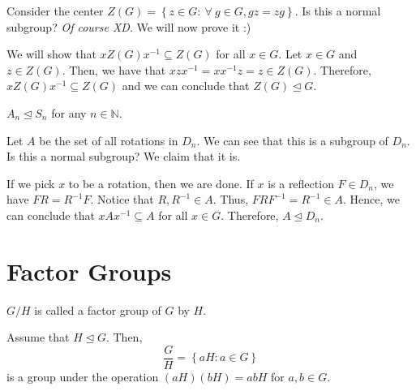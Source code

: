 \begin{nexample}
    Consider the center \(Z(G) = \left\{z \in G : \ \forall \ g \in G, gz = zg\right\}\). Is this a normal subgroup? \textit{Of course XD}. We will now prove it :)

    We will show that \(xZ(G)x^{-1} \subseteq Z(G)\) for all \(x \in G\). Let \(x \in G\) and \(z \in Z(G)\). Then, we have that \(xzx^{-1} = xx^{-1}z = z \in Z(G)\). Therefore, \(xZ(G)x^{-1} \subseteq Z(G)\) and we can conclude that \(Z(G) \unlhd G\).
\end{nexample}

\begin{nexample}
    \(A_n \unlhd S_n\) for any \(n \in \mathbb{N}\).
\end{nexample}

\begin{nexample}
    Let \(A\) be the set of all rotations in \(D_n\). We can see that this is a subgroup of \(D_n\). Is this a normal subgroup? We claim that it is.

    If we pick \(x\) to be a rotation, then we are done. If \(x\) is a reflection \(F \in D_n\), we have \(FR = R^{-1}F\). Notice that \(R, R^{-1} \in A\). Thus, \(FRF^{-1} = R^{-1} \in A\). Hence, we can conclude that \(xAx^{-1} \subseteq A\) for all \(x \in G\). Therefore, \(A \unlhd D_n\).
\end{nexample}

\section{Factor Groups}

\begin{definition}
    \( G / H \) is called a factor group of \(G\) by \(H\).
\end{definition}

\begin{theorem}[Holder, 1889]
    Assume that \(H \unlhd G\). Then, 
    \[
        \frac{G}{H} = \left\{aH : a \in G\right\}
    \]
    is a group under the operation \((aH)(bH) = abH\) for \(a, b \in G\).
\end{theorem}

